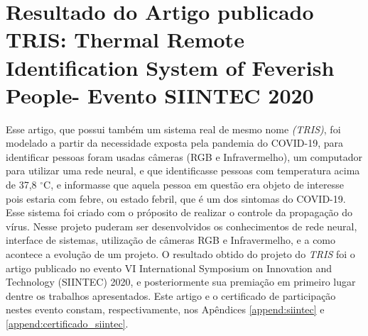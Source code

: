 \section{Resultado do Artigo publicado TRIS: Thermal Remote Identification System of Feverish People- Evento SIINTEC 2020 }
\label{sec:siintec}
Esse artigo, que possui também um sistema real de mesmo nome \textit{(TRIS)}, foi modelado a partir da necessidade exposta pela pandemia do COVID-19, para identificar pessoas  foram usadas câmeras (RGB e Infravermelho), um computador para utilizar uma rede neural, e que identificasse pessoas com temperatura acima de 37,8 $^\circ$C, e informasse que aquela pessoa em questão era objeto de interesse pois estaria com febre, ou estado febril, que é um dos sintomas do COVID-19. Esse sistema foi criado com o próposito de realizar o controle da propagação do vírus. Nesse projeto puderam ser desenvolvidos os conhecimentos de rede neural, interface de sistemas, utilização de câmeras RGB e Infravermelho, e a como acontece a evolução de um projeto.
O resultado obtido do projeto do \textit{TRIS} foi o artigo publicado no evento VI International Symposium on Innovation and Technology (SIINTEC) 2020, e posteriormente sua premiação em primeiro lugar dentre os trabalhos apresentados. Este artigo e o certificado de participação nestes evento constam, respectivamente, nos Apêndices \ref{append:siintec} e \ref{append:certificado_siintec}.